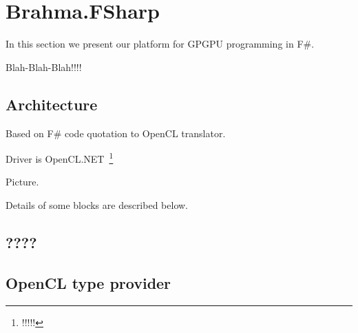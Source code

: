 \section{Brahma.FSharp}

In this section we present our platform for GPGPU programming in F\#.

Blah-Blah-Blah!!!!

\subsection{Architecture}

Based on F\# code quotation to OpenCL translator.

Driver is OpenCL.NET~\footnote{!!!!!}

Picture.

Details of some blocks are described below.


\subsection{????}
\subsection{OpenCL type provider}